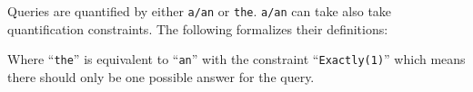 \documentclass{article}
\begin{document}
Queries are quantified by either \texttt{a/an} or \texttt{the}. \texttt{a/an} can take also take quantification constraints. The following formalizes their definitions:



Where ``\texttt{the}'' is equivalent to ``\texttt{an}'' with the constraint ``\texttt{Exactly(1)}'' which means there should only be one possible answer for the query.
\end{document}

